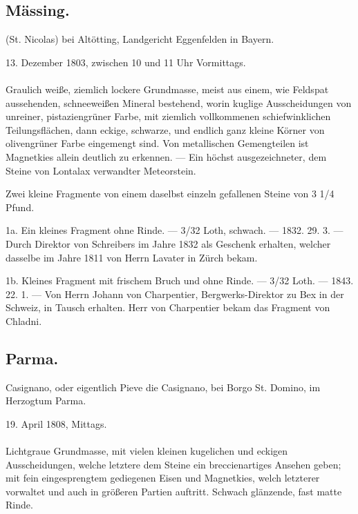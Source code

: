 \documentclass[a4paper, 11pt, oneside, polutonikogreek, german]{article}
\begin{document}
\subsection{Mässing.}
\begin{center}
\small
(St. Nicolas) bei Altötting, Landgericht Eggenfelden in Bayern.

13. Dezember 1803, zwischen 10 und 11 Uhr Vormittags.
\end{center}
\paragraph{}
Graulich weiße, ziemlich lockere Grundmasse, meist aus einem, wie Feldspat aussehenden, schneeweißen Mineral bestehend‚ worin kuglige Ausscheidungen von unreiner, pistaziengrüner Farbe, mit ziemlich vollkommenen schiefwinklichen Teilungsflächen, dann eckige, schwarze, und endlich ganz kleine Körner von olivengrüner Farbe eingemengt sind. Von metallischen Gemengteilen ist Magnetkies allein deutlich zu erkennen. — Ein höchst ausgezeichneter, dem Steine von Lontalax verwandter Meteorstein.

Zwei kleine Fragmente von einem daselbst einzeln gefallenen Steine von 3 1/4 Pfund.

1a. Ein kleines Fragment ohne Rinde. — 3/32 Loth, schwach. — 1832. 29. 3. — Durch Direktor von Schreibers im Jahre 1832 als Geschenk erhalten, welcher dasselbe im Jahre 1811 von Herrn Lavater in Zürch bekam.

1b. Kleines Fragment mit frischem Bruch und ohne Rinde. — 3/32 Loth. — 1843. 22. 1. — Von Herrn Johann von Charpentier, Bergwerks-Direktor zu Bex in der Schweiz, in Tausch erhalten. Herr von Charpentier bekam das Fragment von Chladni.
\subsection{Parma.}
\begin{center}
\small
Casignano, oder eigentlich Pieve die Casignano, bei Borgo St. Domino, im Herzogtum Parma.

19. April 1808, Mittags.
\end{center}
\paragraph{}
Lichtgraue Grundmasse, mit vielen kleinen kugelichen und eckigen Ausscheidungen, welche letztere dem Steine ein breccienartiges Ansehen geben; mit fein eingesprengtem gediegenen Eisen und Magnetkies, welch letzterer vorwaltet und auch in größeren Partien auftritt. Schwach glänzende, fast matte Rinde.
\end{document}
